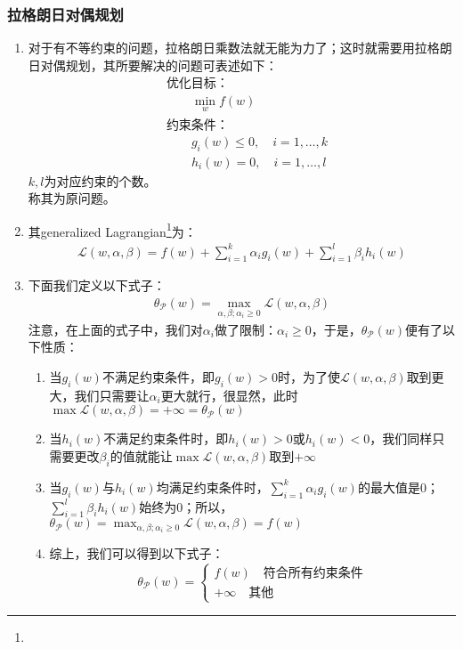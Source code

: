\subsubsection{拉格朗日对偶规划}
\begin{enumerate}
	\item 对于有不等约束的问题，拉格朗日乘数法就无能为力了；这时就需要用拉格朗日对偶规划，其所要解决的问题可表述如下：
	\begin{align}
		&\text{优化目标：} \\
		& \qquad \min_{w} f(w) \\
		&\text{约束条件：} \\
		& \qquad g_i(w) \leq 0, \quad i=1,\dots,k \\
		& \qquad h_i(w) = 0, \quad i=1,\dots,l
	\end{align}
	$k, l$为对应约束的个数。\\
	称其为原问题。
	\item 其generalized Lagrangian\footnote{{\color{red}{不知道怎么翻译}}}为：
	\begin{align}
		\mathcal{L}(w, \alpha, \beta) = f(w) + \sum_{i=1}^{k}\alpha_ig_i(w) + \sum_{i=1}^{l}\beta_ih_i(w)
	\end{align}
	\item 下面我们定义以下式子：
	\begin{align}
		\theta_{\mathcal{P}}(w) = \max_{\alpha, \beta; \alpha_i\geq0} \mathcal{L}(w, \alpha, \beta)
	\end{align}
	注意，在上面的式子中，我们对$\alpha_i$做了限制：$\alpha_i\geq 0$，于是，$\theta_{\mathcal{P}}(w)$便有了以下性质：
	\begin{enumerate}
		\item 当$g_i(w)$不满足约束条件，即$g_i(w)>0$时，为了使$\mathcal{L}(w, \alpha, \beta)$取到更大，我们只需要让$\alpha_i$更大就行，很显然，此时$\max \mathcal{L}(w, \alpha, \beta) = +\infty = \theta_{\mathcal{P}}(w)$
		\item 当$h_i(w)$不满足约束条件时，即$h_i(w)>0$或$h_i(w)<0$，我们同样只需要更改$\beta_i$的值就能让$\max \mathcal{L}(w, \alpha, \beta)$取到$+\infty$
		\item 当$g_i(w)$与$h_i(w)$均满足约束条件时，$\sum_{i=1}^{k}\alpha_i g_i(w)$的最大值是0；$\sum_{i=1}^{l}\beta_ih_i(w)$始终为0；所以，$\theta_{\mathcal{P}}(w)=\max_{\alpha, \beta; \alpha_i\geq0} \mathcal{L}(w, \alpha, \beta)=f(w)$
		\item 综上，我们可以得到以下式子：
		\[ \theta_{\mathcal{P}}(w)=\begin{cases}
		f(w) \quad \text{符合所有约束条件} \\
		+\infty \quad \text{其他}
		\end{cases} \]
	\end{enumerate}


\end{enumerate}
